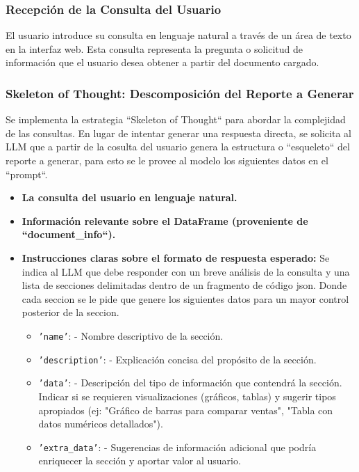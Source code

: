 \subsubsection{Recepción de la Consulta del Usuario}

El usuario introduce su consulta en lenguaje natural a través de un área de texto en la interfaz web. Esta consulta representa la pregunta o solicitud de información que el usuario desea obtener a partir del documento cargado.

\subsubsection{Skeleton of Thought: Descomposición del Reporte a Generar}

Se implementa la estrategia ``Skeleton of Thought`` para abordar la complejidad de las consultas.  En lugar de intentar generar una respuesta directa,  se solicita al LLM que a partir de la cosulta del usuario genera la estructura o ``esqueleto`` del reporte a generar, para esto se le provee al modelo los siguientes datos en el ``prompt``.

\begin{itemize}
	\item \textbf{La consulta del usuario en lenguaje natural.}
	\item \textbf{Información relevante sobre el DataFrame (proveniente de ``document\_info``).}
	\item \textbf{Instrucciones claras sobre el formato de respuesta esperado:}  Se indica al LLM que debe responder con un breve análisis de la consulta y una lista de secciones delimitadas dentro de un fragmento de código json. Donde cada seccion se le pide que genere los siguientes datos para un mayor control posterior de la seccion. 
	\begin{itemize}
		\item \texttt{'name'}: - Nombre descriptivo de la sección.
		\item \texttt{'description'}: -  Explicación concisa del propósito de la sección.
		\item \texttt{'data'}: - Descripción del tipo de información que contendrá la sección.  Indicar si se requieren visualizaciones (gráficos, tablas) y sugerir tipos apropiados (ej: "Gráfico de barras para comparar ventas", "Tabla con datos numéricos detallados").
		\item \texttt{'extra\_data'}: -  Sugerencias de información adicional que podría enriquecer la sección y aportar valor al usuario.
	\end{itemize}
\end{itemize}

